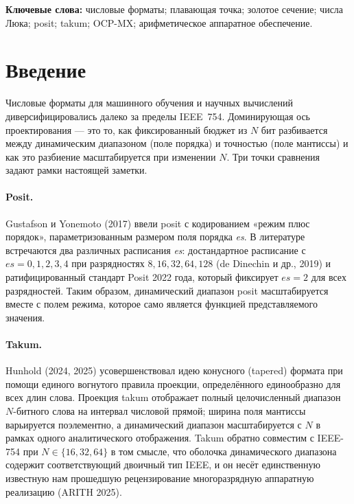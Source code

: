 \documentclass[11pt,a4paper]{article}
\theoremstyle{plain}
\begin{document}
\noindent\textbf{Ключевые слова:} числовые форматы; плавающая точка; золотое
сечение; числа Люка; posit; takum; OCP-MX; арифметическое аппаратное
обеспечение.

\section{Введение}

Числовые форматы для машинного обучения и научных вычислений
диверсифицировались далеко за пределы IEEE~754. Доминирующая ось проектирования ---
это то, как фиксированный бюджет из \(N\) бит разбивается между динамическим
диапазоном (поле порядка) и точностью (поле мантиссы) и как это разбиение
масштабируется при изменении \(N\). Три точки сравнения задают рамки настоящей
заметки.

\paragraph{Posit.}
Gustafson и Yonemoto (2017) ввели posit с кодированием «режим плюс порядок»,
параметризованным размером поля порядка \emph{es}. В литературе встречаются
два различных расписания \emph{es}: достандартное расписание с
\(es = 0,1,2,3,4\) при разрядностях \(8,16,32,64,128\) (de Dinechin и др., 2019)
и ратифицированный стандарт Posit 2022 года, который фиксирует \(es = 2\) для
всех разрядностей. Таким образом, динамический диапазон posit масштабируется
вместе с полем режима, которое само является функцией представляемого
значения.

\paragraph{Takum.}
Hunhold (2024, 2025) усовершенствовал идею конусного (tapered) формата при
помощи единого вогнутого правила проекции, определённого единообразно для всех
длин слова. Проекция takum отображает полный целочисленный диапазон \(N\)-битного
слова на интервал числовой прямой; ширина поля мантиссы варьируется
поэлементно, а динамический диапазон масштабируется с \(N\) в рамках одного
аналитического отображения. Takum обратно совместим с IEEE-754 при
\(N \in \{16,32,64\}\) в том смысле, что оболочка динамического диапазона
содержит соответствующий двоичный тип IEEE, и он несёт единственную известную
нам прошедшую рецензирование многоразрядную аппаратную реализацию (ARITH 2025).
\end{document}
